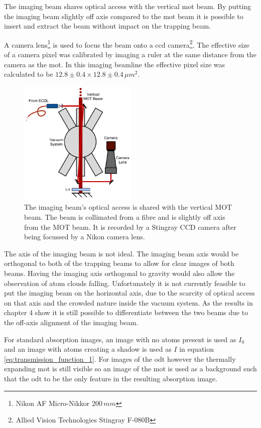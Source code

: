 The imaging beam shares optical access with the vertical \gls{mot} beam. By putting the imaging beam slightly off axis compared to the \gls{mot} beam it is possible to insert and extract the beam without impact on the trapping beam.

A camera lens\footnote{Nikon AF Micro-Nikkor $200\,\unit{mm}$} is used to focus the beam onto a \gls{ccd} camera\footnote{Allied Vision Technologies Stingray F-080B}. The effective size of a camera pixel was calibrated by imaging a ruler at the same distance from the camera as the \gls{mot}. In this imaging beamline the effective pixel size was calculated to be $12.8\pm0.4\times12.8\pm0.4\,\unit{\mu m^2}$.

\begin{figure}[h]
\centering
\includegraphics[width=0.5\textwidth]{figs/ImagingRig.pdf}
\caption{The imaging beam's optical access is shared with the vertical MOT beam. The beam is collimated from a fibre and is slightly off axis from the MOT beam. It is recorded by a Stingray CCD camera after being focussed by a Nikon camera lens.}
\label{fig:imaging_rig}
\end{figure}

The axis of the imaging beam is not ideal. The imaging beam axis would be orthogonal to both of the trapping beams to allow for clear images of both beams. Having the imaging axis orthogonal to gravity would also allow the observation of atom clouds falling. Unfortunately it is not currently feasible to put the imaging beam on the horizontal axis, due to the scarcity of optical access on that axis and the crowded nature inside the vacuum system. As the results in chapter 4 show it is still possible to differentiate between the two beams due to the off-axis alignment of the imaging beam.

For standard absorption images, an image with no atoms present is used as $I_0$ and an image with atoms creating a shadow is used as $I$ in equation \ref{eq:transmission_function_1}. For images of the \gls{odt} however the thermally expanding \gls{mot} is still visible so an image of the \gls{mot} is used as a background such that the \gls{odt} to be the only feature in the resulting absorption image.

